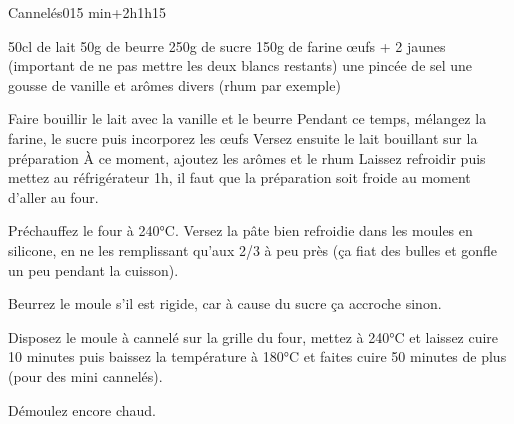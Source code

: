 \begin{recette}{Cannelés}{0}{15 min+2h}{1h15}
\begin{ingredients}
\ingredient 50cl de lait
\ingredient 50g de beurre
\ingredient 250g de sucre
\ingredient 150g de farine
 œufs + 2 jaunes (important de ne pas mettre les deux blancs restants)
\ingredient une pincée de sel
\ingredient une gousse de vanille et arômes divers (rhum par exemple)
\end{ingredients}

\begin{preparation}
\etape Faire bouillir le lait avec la vanille et le beurre
\etape Pendant ce temps, mélangez la farine, le sucre puis incorporez les œufs
\etape Versez ensuite le lait bouillant sur la préparation
\etape À ce moment, ajoutez les arômes et le rhum
\etape Laissez refroidir puis mettez au réfrigérateur 1h, il faut que la préparation soit froide au moment d'aller au four.
\end{preparation}

\begin{cuisson}
Préchauffez le four à 240°C. 
Versez la pâte bien refroidie dans les moules en silicone, en ne les remplissant qu'aux 2/3 à peu près (ça fiat des bulles et gonfle un peu pendant la cuisson). 
\begin{remarque}
Beurrez le moule s'il est rigide, car à cause du sucre ça accroche sinon.
\end{remarque}
Disposez le moule à cannelé sur la grille du four, mettez à 240°C et laissez cuire 10 minutes puis baissez la température à 180°C et faites cuire 50 minutes de plus (pour des mini cannelés). 

Démoulez encore chaud.
\end{cuisson}
\end{recette}

